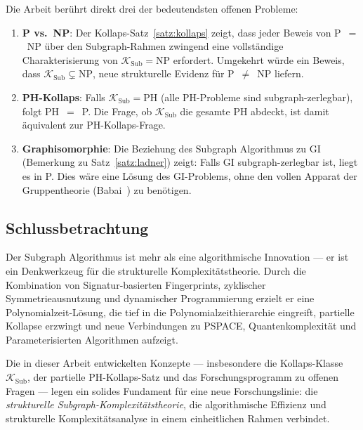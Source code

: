 ﻿\documentclass[a4paper,12pt]{article}
\theoremstyle{definition}
\begin{document}
Die Arbeit berührt direkt drei der bedeutendsten offenen Probleme:

\begin{enumerate}
  \item \textbf{P vs.\ NP}: Der Kollaps-Satz~\ref{satz:kollaps} zeigt,
        dass jeder Beweis von P~$=$~NP über den Subgraph-Rahmen zwingend
        eine vollständige Charakterisierung von $\mathcal{K}_\mathrm{Sub} = \mathrm{NP}$
        erfordert. Umgekehrt würde ein Beweis, dass $\mathcal{K}_\mathrm{Sub} \subsetneq \mathrm{NP}$,
        neue strukturelle Evidenz für P~$\neq$~NP liefern.

  \item \textbf{PH-Kollaps}: Falls $\mathcal{K}_\mathrm{Sub} = \mathrm{PH}$
        (alle PH-Probleme sind subgraph-zerlegbar), folgt PH~$=$~P.
        Die Frage, ob $\mathcal{K}_\mathrm{Sub}$ die gesamte PH abdeckt,
        ist damit äquivalent zur PH-Kollaps-Frage.

  \item \textbf{Graphisomorphie}: Die Beziehung des Subgraph Algorithmus
        zu GI (Bemerkung zu Satz~\ref{satz:ladner}) zeigt:
        Falls GI subgraph-zerlegbar ist, liegt es in P.
        Dies wäre eine Lösung des GI-Problems, ohne den vollen Apparat
        der Gruppentheorie (Babai~\cite{babai2016graph}) zu benötigen.
\end{enumerate}

\subsection{Schlussbetrachtung}

Der Subgraph Algorithmus ist mehr als eine algorithmische Innovation ---
er ist ein Denkwerkzeug für die strukturelle Komplexitätstheorie.
Durch die Kombination von Signatur-basierten Fingerprints, zyklischer Symmetrieausnutzung
und dynamischer Programmierung erzielt er eine Polynomialzeit-Lösung,
die tief in die Polynomialzeithierarchie eingreift, partielle Kollapse erzwingt
und neue Verbindungen zu PSPACE, Quantenkomplexität und Parameterisierten Algorithmen aufzeigt.

Die in dieser Arbeit entwickelten Konzepte --- insbesondere die Kollaps-Klasse
$\mathcal{K}_\mathrm{Sub}$, der partielle PH-Kollaps-Satz und das Forschungsprogramm
zu offenen Fragen --- legen ein solides Fundament für eine neue Forschungslinie:
die \emph{strukturelle Subgraph-Komplexitätstheorie}, die algorithmische Effizienz
und strukturelle Komplexitätsanalyse in einem einheitlichen Rahmen verbindet.
\end{document}
